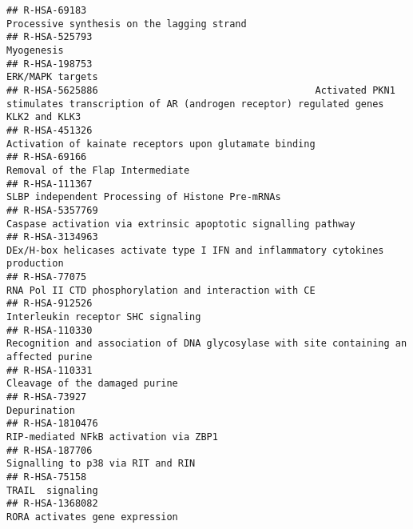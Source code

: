 \documentclass[
]{article}
\begin{document}
\begin{verbatim}
## R-HSA-69183                                                                                             Processive synthesis on the lagging strand
## R-HSA-525793                                                                                                                            Myogenesis
## R-HSA-198753                                                                                                                      ERK/MAPK targets
## R-HSA-5625886                                      Activated PKN1 stimulates transcription of AR (androgen receptor) regulated genes KLK2 and KLK3
## R-HSA-451326                                                                                Activation of kainate receptors upon glutamate binding
## R-HSA-69166                                                                                                       Removal of the Flap Intermediate
## R-HSA-111367                                                                                      SLBP independent Processing of Histone Pre-mRNAs
## R-HSA-5357769                                                                        Caspase activation via extrinsic apoptotic signalling pathway
## R-HSA-3134963                                                       DEx/H-box helicases activate type I IFN and inflammatory cytokines production 
## R-HSA-77075                                                                                 RNA Pol II CTD phosphorylation and interaction with CE
## R-HSA-912526                                                                                                    Interleukin receptor SHC signaling
## R-HSA-110330                                                Recognition and association of DNA glycosylase with site containing an affected purine
## R-HSA-110331                                                                                                        Cleavage of the damaged purine
## R-HSA-73927                                                                                                                           Depurination
## R-HSA-1810476                                                                                                RIP-mediated NFkB activation via ZBP1
## R-HSA-187706                                                                                                     Signalling to p38 via RIT and RIN
## R-HSA-75158                                                                                                                       TRAIL  signaling
## R-HSA-1368082                                                                                                       RORA activates gene expression

\end{verbatim}
\end{document}
